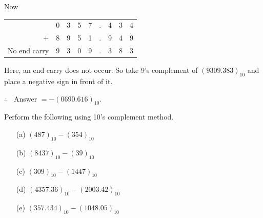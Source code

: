 \begin{solution}
\begin{itemize}
Now
\begin{center}
\tabcolsep=4pt
\begin{tabular}{rcccccccc}
 & 0 & 3 & 5 & 7 & . & 4 & 3 & 4\\
+ & 8 & 9 & 5 & 1 & . & 9 & 4 & 9\\
\cline{2-9}
No end carry & 9 & 3 & 0 & 9 & . & 3 & 8 & 3
\end{tabular}
\end{center}
Here, an end carry does not occur. So take 9's complement of $(9309.383)_{10}$ and place a negative sign in front of it.

$\therefore$~ Answer $=-(0690.616)_{10}$.
\end{itemize}
\end{solution}

\begin{problem}\label{prob5.44}
Perform the following using 10's complement method.
\begin{itemize}
\item[(a)] $(487)_{10}-(354)_{10}$

\item[(b)] $(8437)_{10}-(39)_{10}$

\item[(c)] $(309)_{10}-(1447)_{10}$

\item[(d)] $(4357.36)_{10}-(2003.42)_{10}$

\item[(e)] $(357.434)_{10}-(1048.05)_{10}$
\end{itemize}
\end{problem}

